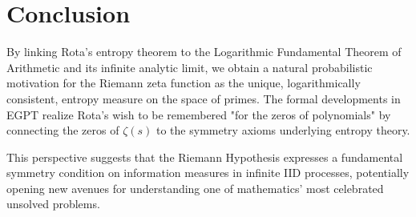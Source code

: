 \documentclass[12pt]{article}
\begin{document}
\section*{Conclusion}

By linking Rota's entropy theorem to the Logarithmic Fundamental Theorem of Arithmetic and its infinite analytic limit, we obtain a natural probabilistic motivation for the Riemann zeta function as the unique, logarithmically consistent, entropy measure on the space of primes. The formal developments in EGPT realize Rota's wish to be remembered "for the zeros of polynomials" by connecting the zeros of $\zeta(s)$ to the symmetry axioms underlying entropy theory.

This perspective suggests that the Riemann Hypothesis expresses a fundamental symmetry condition on information measures in infinite IID processes, potentially opening new avenues for understanding one of mathematics' most celebrated unsolved problems.  
\end{document}

